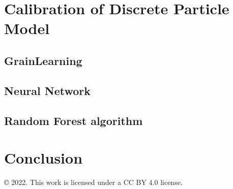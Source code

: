 \documentclass{article}
\begin{document}


\section{Calibration of Discrete Particle Model}\label{section:Calibration}
    
\subsection{GrainLearning}



\subsection{Neural Network}


\subsection{Random Forest algorithm}








\section{Conclusion} 


\pagebreak 





\begin{center}
© 2022. This work is licensed under a CC BY 4.0 license. 
\end{center}
\end{document}

